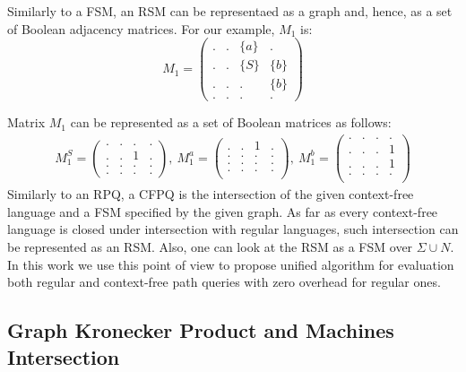 Similarly to a FSM, an RSM can be representaed as a graph and, hence, as a set of Boolean adjacency matrices.
For our example, $M_1$ is:
    $$
    M_1 =
    \begin{pmatrix}
    . & . & \{a\} & .     \\
    . & . & \{S\} & \{b\} \\
    . & . & . & \{b\}     \\
    . & . & . & .
    \end{pmatrix}
    $$

Matrix $M_1$ can be represented as a set of Boolean matrices as follows:
{\small
\begin{align*}
M_1^S =
\begin{pmatrix}      
    . & . & . & .   \\
    . & . & 1 & .   \\
    . & . & . & .   \\
    . & . & . & .   
\end{pmatrix},~M_1^a =
\begin{pmatrix}       
   . & . & 1 & .   \\
   . & . & . & .   \\
   . & . & . & .   \\
   . & . & . & .   \\
\end{pmatrix},~M_1^b =
\begin{pmatrix}      
    . & . & . & .   \\
    . & . & . & 1   \\
    . & . & . & 1   \\
    . & . & . & .   \\
\end{pmatrix}
\end{align*}
}
Similarly to an RPQ, a CFPQ is the intersection of the given context-free language and a FSM specified by the given graph.
As far as every context-free language is closed under intersection with regular languages, such intersection can be represented as an RSM.
Also, one can look at the RSM as a FSM over $\Sigma \cup N$.
In this work we use this point of view to propose unified algorithm for evaluation both regular and context-free path queries with zero overhead for regular ones. 
 

\subsection{Graph Kronecker Product and Machines Intersection}


